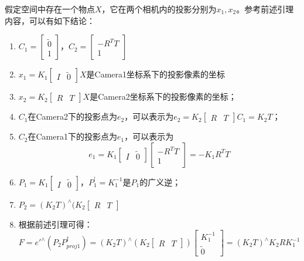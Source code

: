 假定空间中存在一个物点$X$，它在两个相机内的投影分别为$x_1, x_2$。参考前述引理内容，可以有如下结论：
\begin{enumerate}
\item $C_1=\left[ \begin{array}{c} \widetilde{0} \\ 1 \end{array} \right]$，$C_2=\left[ \begin{array}{c}  -R^TT\\1\end{array} \right]$
\item $x_1=K_1 \left[ \begin{array}{c|c} I & \widetilde{0} \end{array}\right]X$是Camera1坐标系下的投影像素的坐标
\item $x_2=K_2 \left[ \begin{array}{c|c} R & T\end{array}\right]X$是Camera2坐标系下的投影像素的坐标；
\item $C_1$在Camera2下的投影点为$e_2$，可以表示为$e_2=K_2 \left[ \begin{array}{c|c} R & T\end{array}\right]C_1=K_2T$；
\item $C_2$在Camera1下的投影点为$e_1$，可以表示为\[e_1=K_1 \left[ \begin{array}{c|c} I & \widetilde{0} \end{array}\right]\left[ \begin{array}{c}  -R^TT\\1\end{array} \right]=-K_1R^TT\]
\item $P_1=K_1 \left[ \begin{array}{c|c} I & \widetilde{0} \end{array}\right]$，$P_1^{^\dagger}= K_1^{-1}$是$P_1$的广义逆；
\item $P_2=(K_2T)^{\wedge}(K_2 \left[ \begin{array}{c|c} R & T\end{array}\right]$
\item 根据前述引理可得：\[F=e'^{\wedge}(P_2 P_{proj1}^\dagger) 
	=(K_2T)^{\wedge}(K_2 \left[ \begin{array}{c|c} R & T\end{array}\right]) \left[ \begin{array}{c}K_1^{-1}\\ \widetilde{0} \end{array}\right]
	=(K_2T)^{\wedge}K_2RK_1^{-1}\]

\end{enumerate}
